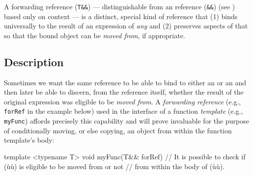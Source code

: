 

\setcounter{table}{0}
\setcounter{footnote}{0}
\setcounter{lstlisting}{0}

A forwarding reference (\lstinline!T&&!) --- distinguishable from an
 reference (\lstinline!&&!) (see ) 
based only on context
--- is a distinct, special kind of reference that (1) binds
universally to the result of an expression of \emph{any}  and (2) preserves aspects of that  so
that the bound object can be \emph{moved from}, if appropriate.

\subsection[Description]{Description}\label{description-forwardingref}

Sometimes we want the same reference to be able to bind to either an
 or an  and then later be able to discern,
from the reference itself, whether the result of the original expression
was eligible to be \emph{moved from}. A \emph{forwarding reference}
(e.g., \lstinline!forRef! in the example below) used in the interface of a function
\emph{template} (e.g., \lstinline!myFunc!) affords precisely this
capability and will prove invaluable for the purpose of conditionally
moving, or else copying, an object from within the function template's
body:

\begin{emcppslisting}
template <typename T>
void myFunc(T&& forRef)
{
    // It is possible to check if (ù{}ù) is eligible to be moved from or not
    // from within the body of (ù{}ù).
}
\end{emcppslisting}


